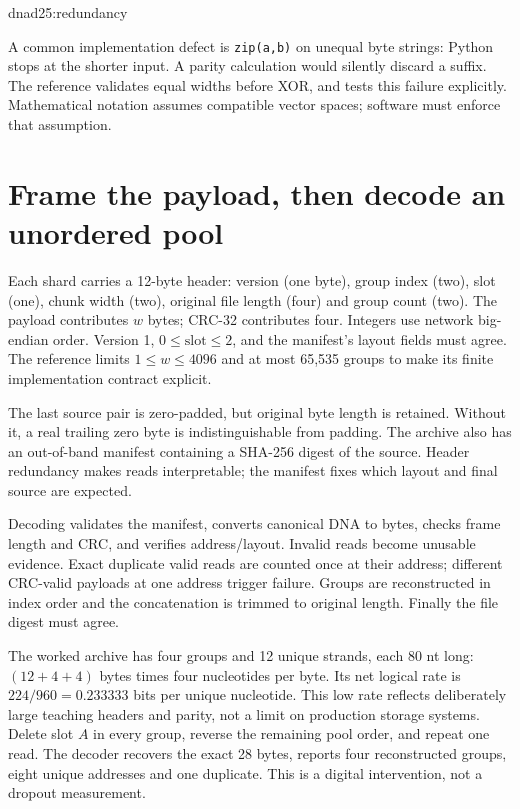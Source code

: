 {dnad25:redundancy}

A common implementation defect is \texttt{zip(a,b)} on unequal byte strings:
Python stops at the shorter input. A parity calculation would silently
discard a suffix. The reference validates equal widths before XOR, and tests
this failure explicitly. Mathematical notation assumes compatible vector
spaces; software must enforce that assumption.

\section{Frame the payload, then decode an unordered pool}
Each shard carries a 12-byte header: version (one byte), group index (two),
slot (one), chunk width (two), original file length (four) and group count (two).
The payload contributes $w$ bytes; CRC-32 contributes four. Integers use network
big-endian order. Version 1, $0\leq\mathrm{slot}\leq2$, and the manifest's
layout fields must agree. The reference limits $1\leq w\leq4096$ and at most
65,535 groups to make its finite implementation contract explicit.

The last source pair is zero-padded, but original byte length is retained.
Without it, a real trailing zero byte is indistinguishable from padding.
The archive also has an out-of-band manifest containing a SHA-256 digest of the
source. Header redundancy makes reads interpretable; the manifest
fixes which layout and final source are expected.


Decoding validates the manifest, converts canonical DNA to bytes, checks
frame length and CRC, and verifies address/layout. Invalid reads become
unusable evidence. Exact duplicate valid reads are counted once at their address;
different CRC-valid payloads at one address trigger failure. Groups are reconstructed
in index order and the concatenation is trimmed to original length. Finally the
file digest must agree.


The worked archive has four groups and 12 unique strands, each 80 nt long:
$(12+4+4)$ bytes times four nucleotides per byte. Its net logical rate is
$224/960=0.233333$ bits per unique nucleotide. This low rate reflects deliberately
large teaching headers and parity, not a limit on production storage systems.
Delete slot $A$ in every group, reverse the remaining pool order, and repeat one
read. The decoder recovers the exact 28 bytes, reports four reconstructed groups,
eight unique addresses and one duplicate. This is a digital intervention,
not a dropout measurement.

